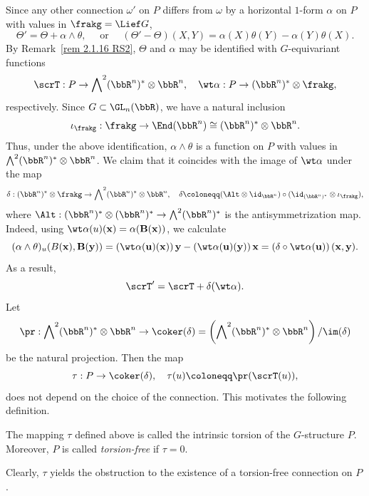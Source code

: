 Since any other connection $\omega'$ on $P$ differs from $\omega$ by a horizontal $1$-form $\alpha$ on $P$ with values in $\frakg=\Lief G$,
\[\Theta'=\Theta+\alpha\wedge\theta,\quad\text{ or }\quad (\Theta'-\Theta)(X,Y)=\alpha(X)\theta(Y)-\alpha(Y)\theta(X).\]
By Remark~\ref{rem 2.1.16 RS2}, $\Theta$ and $\alpha$ may be identified with $G$-equivariant functions 
\[\scrT:P\to \bigwedge\nolimits^2(\bbR^n)^\ast\otimes\bbR^n,\quad \wt\alpha:P\to (\bbR^n)^\ast\otimes\frakg,\]
respectively. Since $G\subset\GL_n(\bbR)$, we have a natural inclusion 
\[\iota_\frakg:\frakg\to \End(\bbR^n)\cong (\bbR^n)^\ast\otimes\bbR^n.\]
Thus, under the above identification, $\alpha\wedge\theta$ is a function on $P$ with values in $\bigwedge\nolimits^2(\bbR^n)^\ast\otimes\bbR^n$. We claim that it coincides with the image of $\wt\alpha$ under the map 
\[\delta:(\bbR^n)^\ast\otimes\frakg\to \bigwedge\nolimits^2(\bbR^n)^\ast\otimes\bbR^n,\quad \delta\coloneqq (\Alt\otimes\id_{\bbR^n})\circ(\id_{(\bbR^n)^\ast}\otimes \iota_\frakg),\]
where $\Alt:(\bbR^n)^\ast\otimes (\bbR^n)^\ast\to \bigwedge\nolimits^2(\bbR^n)^\ast$ is the antisymmetrization map. Indeed, using $\wt\alpha(u)(\bf{x})=\alpha(B(\bf{x}))$, we calculate 
\[(\alpha\wedge\theta)_u(B(\bf{x}),B(\bf{y}))=\left(\wt\alpha(u)(\bf{x})\right)\bf{y}-\left(\wt\alpha(u)(\bf{y})\right)\bf{x}=\left(\delta\circ\wt\alpha(u)\right)(\bf{x},\bf{y}).\]
As a result,
\[\scrT'=\scrT+\delta(\wt\alpha).\label{eq 2.2.3 RS2}\]
Let 
\[\pr :\bigwedge\nolimits^2(\bbR^n)^\ast\otimes\bbR^n\to \coker(\delta)=\left(\bigwedge\nolimits^2(\bbR^n)^\ast\otimes\bbR^n\right)\slash\im(\delta)\]
be the natural projection. Then the map 
\[\tau:P\to \coker(\delta),\quad \tau(u)\coloneqq \pr(\scrT(u)),\]
does not depend on the choice of the connection. This motivates the following definition.

\begin{defn}
    The mapping $\tau$ defined above is called the intrinsic torsion of the $G$-structure $P$. Moreover, $P$ is called \emph{torsion-free} if $\tau=0$.
\end{defn}

Clearly, $\tau$ yields the obstruction to the existence of a torsion-free connection on $P$.

